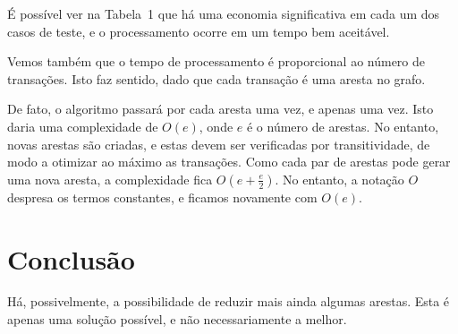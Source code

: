 \documentclass[12pt]{article}
\begin{document}
É possível ver na Tabela~1 que há uma economia significativa
em cada um dos casos de teste, e o processamento ocorre em um tempo bem aceitável.

Vemos também que o tempo de processamento é proporcional ao número de
transações. Isto faz sentido, dado que cada transação é uma aresta no grafo.

De fato, o algoritmo passará por cada aresta uma vez, e apenas uma vez. Isto
daria uma complexidade de $O(e)$, onde $e$ é o número de arestas. No entanto,
novas arestas são criadas, e estas devem ser verificadas por transitividade, de
modo a otimizar ao máximo as transações. Como cada par de arestas pode gerar uma
nova aresta, a complexidade fica $O(e + \frac{e}{2})$. No entanto, a notação $O$
despresa os termos constantes, e ficamos novamente com $O(e)$.

\section{Conclusão}\label{sec:conclusao}

Há, possivelmente, a possibilidade de reduzir mais ainda algumas arestas. Esta é
apenas uma solução possível, e não necessariamente a melhor.
\end{document}

